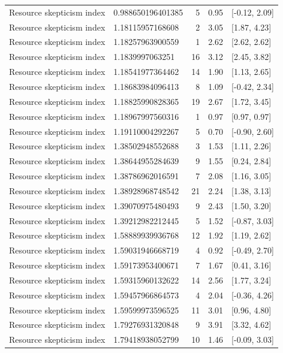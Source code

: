 \begin{tabular}{llrll}
Resource skepticism index & 0.988650196401385 & 5 & 0.95 & {}[-0.12, 2.09]\\
Resource skepticism index & 1.18115957168608 & 2 & 3.05 & {}[1.87, 4.23]\\
Resource skepticism index & 1.18257963900559 & 1 & 2.62 & {}[2.62, 2.62]\\
\addlinespace
Resource skepticism index & 1.1839997063251 & 16 & 3.12 & {}[2.45, 3.82]\\
Resource skepticism index & 1.18541977364462 & 14 & 1.90 & {}[1.13, 2.65]\\
Resource skepticism index & 1.18683984096413 & 8 & 1.09 & {}[-0.42, 2.34]\\
Resource skepticism index & 1.18825990828365 & 19 & 2.67 & {}[1.72, 3.45]\\
Resource skepticism index & 1.18967997560316 & 1 & 0.97 & {}[0.97, 0.97]\\
\addlinespace
Resource skepticism index & 1.19110004292267 & 5 & 0.70 & {}[-0.90, 2.60]\\
Resource skepticism index & 1.38502948552688 & 3 & 1.53 & {}[1.11, 2.26]\\
Resource skepticism index & 1.38644955284639 & 9 & 1.55 & {}[0.24, 2.84]\\
Resource skepticism index & 1.38786962016591 & 7 & 2.08 & {}[1.16, 3.05]\\
Resource skepticism index & 1.38928968748542 & 21 & 2.24 & {}[1.38, 3.13]\\
\addlinespace
Resource skepticism index & 1.39070975480493 & 9 & 2.43 & {}[1.50, 3.20]\\
Resource skepticism index & 1.39212982212445 & 5 & 1.52 & {}[-0.87, 3.03]\\
Resource skepticism index & 1.58889939936768 & 12 & 1.92 & {}[1.19, 2.62]\\
Resource skepticism index & 1.59031946668719 & 4 & 0.92 & {}[-0.49, 2.70]\\
Resource skepticism index & 1.59173953400671 & 7 & 1.67 & {}[0.41, 3.16]\\
\addlinespace
Resource skepticism index & 1.59315960132622 & 14 & 2.56 & {}[1.77, 3.24]\\
Resource skepticism index & 1.59457966864573 & 4 & 2.04 & {}[-0.36, 4.26]\\
Resource skepticism index & 1.59599973596525 & 11 & 3.01 & {}[0.96, 4.80]\\
Resource skepticism index & 1.79276931320848 & 9 & 3.91 & {}[3.32, 4.62]\\
Resource skepticism index & 1.79418938052799 & 10 & 1.46 & {}[-0.09, 3.03]\\

\end{tabular}
